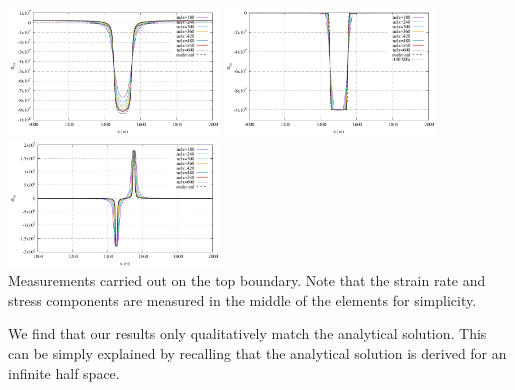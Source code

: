 \begin{center}
\includegraphics[width=5.6cm]{python_codes/fieldstone_34/results/exp4/top_profile_sigma_xx.pdf}
\includegraphics[width=5.6cm]{python_codes/fieldstone_34/results/exp4/top_profile_sigma_yy.pdf}
\includegraphics[width=5.6cm]{python_codes/fieldstone_34/results/exp4/top_profile_sigma_xy.pdf}\\
{\captionfont Measurements carried out on the top boundary.
Note that the strain rate and stress components are measured in the middle 
of the elements for simplicity.}
\end{center}

We find that our results only qualitatively match the analytical solution. This can 
be simply explained by recalling that the analytical solution is derived for an 
infinite half space. 


